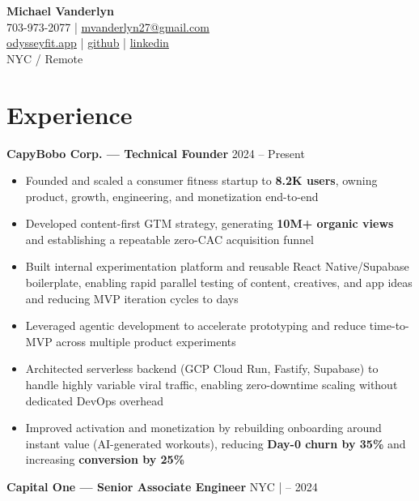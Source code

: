 \documentclass[letterpaper,11pt]{article}
\begin{document}
\begin{center}
{\LARGE \textbf{Michael Vanderlyn}} \\[4pt]
703-973-2077 \quad | \quad \href{mailto:mvanderlyn27@gmail.com}{mvanderlyn27@gmail.com} \\ 
\href{https://odysseyfit.app}{odysseyfit.app} \quad | \quad \href{https://github.com/mvanderlyn27}{github} \quad | \quad \href{https://www.linkedin.com/in/michael-vanderlyn/}{linkedin} \\ 
NYC / Remote
\end{center}

\section*{Experience}

\noindent\textbf{CapyBobo Corp. — Technical Founder} \hfill 2024 – Present

\begin{itemize}[leftmargin=*]
\item Founded and scaled a consumer fitness startup to \textbf{8.2K users}, owning product, growth, engineering, and monetization end-to-end
\item Developed content-first GTM strategy, generating \textbf{10M+ organic views} and establishing a repeatable zero-CAC acquisition funnel
\item Built internal experimentation platform and reusable React Native/Supabase boilerplate, enabling rapid parallel testing of content, creatives, and app ideas and reducing MVP iteration cycles to days
\item Leveraged agentic development to accelerate prototyping and reduce time-to-MVP across multiple product experiments
\item Architected serverless backend (GCP Cloud Run, Fastify, Supabase) to handle highly variable viral traffic, enabling zero-downtime scaling without dedicated DevOps overhead
\item Improved activation and monetization by rebuilding onboarding around instant value (AI-generated workouts), reducing \textbf{Day-0 churn by 35\%} and increasing \textbf{conversion by 25\%}
\end{itemize}

\vspace{2pt}

\noindent\textbf{Capital One — Senior Associate Engineer} \hfill NYC \quad |  – 2024
\end{document}
